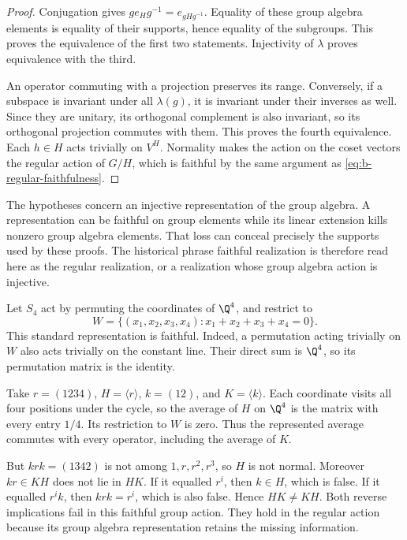 \begin{proof}
Conjugation gives \(ge_Hg^{-1}=e_{gHg^{-1}}\). Equality of these group algebra elements is equality of their supports, hence equality of the subgroups. This proves the equivalence of the first two statements. Injectivity of \(\lambda\) proves equivalence with the third.

An operator commuting with a projection preserves its range. Conversely, if a subspace is invariant under all \(\lambda(g)\), it is invariant under their inverses as well. Since they are unitary, its orthogonal complement is also invariant, so its orthogonal projection commutes with them. This proves the fourth equivalence. Each \(h\in H\) acts trivially on \(V^H\). Normality makes the action on the coset vectors the regular action of \(G/H\), which is faithful by the same argument as \eqref{eq:b-regular-faithfulness}.
\end{proof}

The hypotheses concern an injective representation of the group algebra. A representation can be faithful on group elements while its linear extension kills nonzero group algebra elements. That loss can conceal precisely the supports used by these proofs. The historical phrase faithful realization is therefore read here as the regular realization, or a realization whose group algebra action is injective.

\begin{example}
\label{ex:b-s4-faithfulness}
Let \(S_4\) act by permuting the coordinates of \(\Q^4\), and restrict to
\[
 W=\{(x_1,x_2,x_3,x_4):x_1+x_2+x_3+x_4=0\}.
\]
This standard representation is faithful. Indeed, a permutation acting trivially on \(W\) also acts trivially on the constant line. Their direct sum is \(\Q^4\), so its permutation matrix is the identity.

Take \(r=(1234)\), \(H=\langle r\rangle\), \(k=(12)\), and \(K=\langle k\rangle\). Each coordinate visits all four positions under the cycle, so the average of \(H\) on \(\Q^4\) is the matrix with every entry \(1/4\). Its restriction to \(W\) is zero. Thus the represented average commutes with every operator, including the average of \(K\).

But \(krk=(1342)\) is not among \(1,r,r^2,r^3\), so \(H\) is not normal. Moreover \(kr\in KH\) does not lie in \(HK\). If it equalled \(r^i\), then \(k\in H\), which is false. If it equalled \(r^ik\), then \(krk=r^i\), which is also false. Hence \(HK\ne KH\). Both reverse implications fail in this faithful group action. They hold in the regular action because its group algebra representation retains the missing information.
\end{example}

